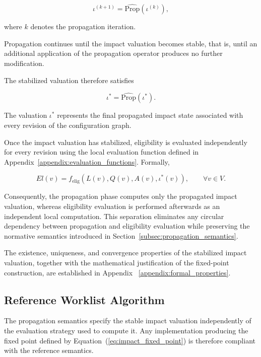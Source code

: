 \documentclass[10pt]{article}
\begin{document}
	\begin{equation}
		\label{eq:impact_iteration}
		\iota^{(k+1)}
		=
		\widehat{\mathrm{Prop}}
		\!\left(
		\iota^{(k)}
		\right),
	\end{equation}
	
	where $k$ denotes the propagation iteration.
	
	Propagation continues until the impact valuation becomes stable, that is, until
	an additional application of the propagation operator produces no further
	modification.
	
	The stabilized valuation therefore satisfies
	
	\begin{equation}
		\label{eq:impact_fixed_point}
		\iota^{*}
		=
		\widehat{\mathrm{Prop}}
		\!\left(
		\iota^{*}
		\right).
	\end{equation}
	
	The valuation $\iota^{*}$ represents the final propagated impact state
	associated with every revision of the configuration graph.
	
	Once the impact valuation has stabilized, eligibility is evaluated
	independently for every revision using the local evaluation function defined in
	Appendix~\ref{appendix:evaluation_functions}. Formally,
	
	\begin{equation}
		\label{eq:eligibility_after_propagation}
		El(v)
		=
		f_{\mathrm{elig}}
		\!\left(
		L(v),
		Q(v),
		A(v),
		\iota^{*}(v)
		\right),
		\qquad
		\forall v\in V.
	\end{equation}
	
	Consequently, the propagation phase computes only the propagated impact
	valuation, whereas eligibility evaluation is performed afterwards as an
	independent local computation. This separation eliminates any circular
	dependency between propagation and eligibility evaluation while preserving the
	normative semantics introduced in Section~\ref{subsec:propagation_semantics}.
	
	The existence, uniqueness, and convergence properties of the stabilized impact
	valuation, together with the mathematical justification of the fixed-point
	construction, are established in Appendix ~\ref{appendix:formal_properties}.
	
	\subsection{Reference Worklist Algorithm}
	\label{appendix:ref_worklist_algo}
	The propagation semantics specify the stable impact valuation independently of
	the evaluation strategy used to compute it. Any implementation producing the
	fixed point defined by Equation~(\ref{eq:impact_fixed_point}) is therefore
	compliant with the reference semantics.
	
\end{document}
